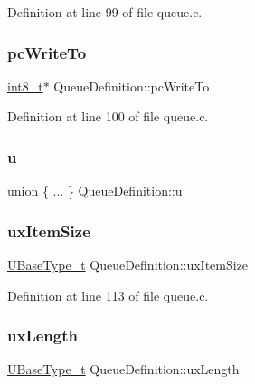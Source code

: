 Definition at line 99 of file queue.\+c.

\mbox{\label{structQueueDefinition_abdf13cc013c8488848cee3fce4f0fed3}} 
\subsubsection{\texorpdfstring{pc\+Write\+To}{pcWriteTo}}
{\footnotesize\ttfamily \hyperlink{stdint_8h_aef44329758059c91c76d334e8fc09700}{int8\+\_\+t}$\ast$ Queue\+Definition\+::pc\+Write\+To}



Definition at line 100 of file queue.\+c.

\mbox{\label{structQueueDefinition_a23e83b160ae20e3e6d4b7a78203cd45d}} 
\subsubsection{\texorpdfstring{u}{u}}
{\footnotesize\ttfamily union \{ ... \}   Queue\+Definition\+::u}

\mbox{\label{structQueueDefinition_a81bb7d3826909244baa9debf5a55abb0}} 
\subsubsection{\texorpdfstring{ux\+Item\+Size}{uxItemSize}}
{\footnotesize\ttfamily \hyperlink{pic32mx_2portmacro_8h_a646f89d4298e4f5afd522202b11cb2e6}{U\+Base\+Type\+\_\+t} Queue\+Definition\+::ux\+Item\+Size}



Definition at line 113 of file queue.\+c.

\mbox{\label{structQueueDefinition_ae80d17a812c669d4d41265b7f693988c}} 
\subsubsection{\texorpdfstring{ux\+Length}{uxLength}}
{\footnotesize\ttfamily \hyperlink{pic32mx_2portmacro_8h_a646f89d4298e4f5afd522202b11cb2e6}{U\+Base\+Type\+\_\+t} Queue\+Definition\+::ux\+Length}



